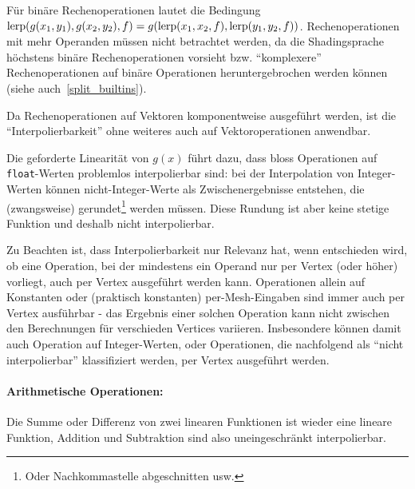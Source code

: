 \documentclass[twoside,a4paper,fleqn,12pt]{article}
\begin{document}
Für binäre Rechenoperationen lautet die Bedingung $\mathrm{lerp} (g (x_1, y_1), g (x_2, y_2), f) = g (\mathrm{lerp} (x_1, x_2, f), \mathrm{lerp} (y_1, y_2, f))$.
Rechenoperationen mit mehr Operanden müssen nicht betrachtet werden, da die Shadingsprache höchstens
binäre Rechenoperationen vorsieht bzw. "`komplexere"' Rechenoperationen auf binäre Operationen heruntergebrochen werden
können (siehe auch~\ref{split_builtins}). %

Da Rechenoperationen auf Vektoren komponentweise ausgeführt werden,  ist die "`Interpolierbarkeit"' ohne weiteres auch auf Vektoroperationen anwendbar.

Die geforderte Linearität von $g(x)$ führt dazu, dass bloss Operationen auf \texttt{float}-Werten problemlos interpolierbar sind:
bei der Interpolation von Integer-Werten können nicht-Integer-Werte als Zwischenergebnisse entstehen,
die (zwangsweise) gerundet\footnote{Oder Nachkommastelle abgeschnitten usw.} werden müssen. Diese Rundung
ist aber keine stetige Funktion und deshalb nicht interpolierbar.

Zu Beachten ist, dass Interpolierbarkeit nur Relevanz hat, wenn entschieden wird, ob eine Operation, bei der mindestens ein Operand
nur per Vertex (oder höher) vorliegt, auch per Vertex ausgeführt werden kann.
Operationen allein auf Konstanten oder (praktisch konstanten) per-Mesh-Eingaben sind immer auch per Vertex ausführbar - das Ergebnis
einer solchen Operation kann nicht zwischen den Berechnungen für verschieden Vertices variieren. Insbesondere können damit
auch Operation auf Integer-Werten, oder Operationen, die nachfolgend als "`nicht interpolierbar"' klassifiziert werden,
per Vertex ausgeführt werden.




\paragraph{Arithmetische Operationen:} Die Summe oder Differenz von zwei linearen Funktionen
ist wieder eine lineare Funktion, Addition und Subtraktion sind also uneingeschränkt interpolierbar.
\end{document}
